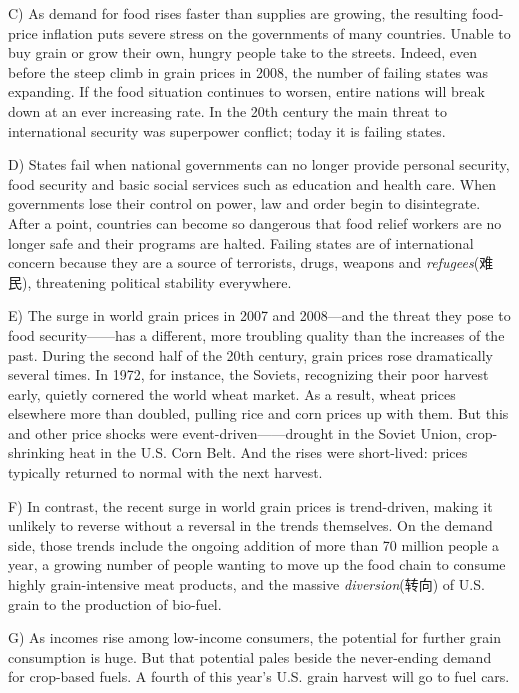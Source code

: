 \documentclass[UTF8,11pt]{ctexart}
\begin{document}
C) As demand for food rises faster than supplies are growing, the resulting food-price inflation puts severe stress on the governments of many countries. Unable to buy grain or grow their own, hungry people take to the streets. Indeed, even before the steep climb in grain prices in 2008, the number of failing states was expanding. If the food situation continues to worsen, entire nations will break down at an ever increasing rate. In the 20th century the main threat to international security was superpower conflict; today it is failing states.


D) States fail when national governments can no longer provide personal security, food security and basic social services such as education and health care. When governments lose their control on power, law and order begin to disintegrate. After a point, countries can become so dangerous that food relief workers are no longer safe and their programs are halted. Failing states are of international concern because they are a source of terrorists, drugs, weapons and\textit{ refugees}(难民), threatening political stability everywhere.


E) The surge in world grain prices in 2007 and 2008—and the threat they pose to food security——has a different, more troubling quality than the increases of the past. During the second half of the 20th century, grain prices rose dramatically several times. In 1972, for instance, the Soviets, recognizing their poor harvest early, quietly cornered the world wheat market. As a result, wheat prices elsewhere more than doubled, pulling rice and corn prices up with them. But this and other price shocks were event-driven——drought in the Soviet Union, crop-shrinking heat in the U.S. Corn Belt. And the rises were short-lived: prices typically returned to normal with the next harvest.


F) In contrast, the recent surge in world grain prices is trend-driven, making it unlikely to reverse without a reversal in the trends themselves. On the demand side, those trends include the ongoing addition of more than 70 million people a year, a growing number of people wanting to move up the food chain to consume highly grain-intensive meat products, and the massive\textit{ diversion}(转向) of U.S. grain to the production of bio-fuel.


G) As incomes rise among low-income consumers, the potential for further grain consumption is huge. But that potential pales beside the never-ending demand for crop-based fuels. A fourth of this year’s U.S. grain harvest will go to fuel cars.
\end{document}
